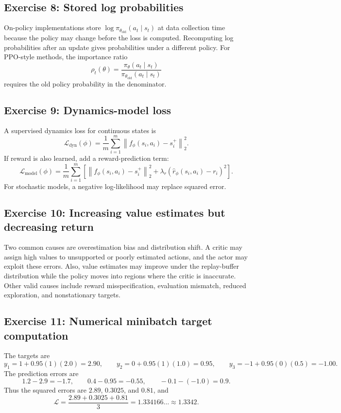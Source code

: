 \subsection*{Exercise 8: Stored log probabilities}
On-policy implementations store $\log\pi_{\theta_{\mathrm{old}}}(a_t\mid s_t)$ at data collection time because the policy may change before the loss is computed. Recomputing log probabilities after an update gives probabilities under a different policy. For PPO-style methods, the importance ratio
\[
\rho_t(\theta)=\frac{\pi_\theta(a_t\mid s_t)}{\pi_{\theta_{\mathrm{old}}}(a_t\mid s_t)}
\]
requires the old policy probability in the denominator.

\subsection*{Exercise 9: Dynamics-model loss}
A supervised dynamics loss for continuous states is
\[
\mathcal{L}_{\mathrm{dyn}}(\phi)=\frac{1}{m}\sum_{i=1}^{m}\left\|f_\phi(s_i,a_i)-s_i^+\right\|_2^2.
\]
If reward is also learned, add a reward-prediction term:
\[
\mathcal{L}_{\mathrm{model}}(\phi)=\frac{1}{m}\sum_{i=1}^{m}\left[\left\|f_\phi(s_i,a_i)-s_i^+\right\|_2^2+\lambda_r\left(\hat r_\phi(s_i,a_i)-r_i\right)^2\right].
\]
For stochastic models, a negative log-likelihood may replace squared error.

\subsection*{Exercise 10: Increasing value estimates but decreasing return}
Two common causes are overestimation bias and distribution shift. A critic may assign high values to unsupported or poorly estimated actions, and the actor may exploit these errors. Also, value estimates may improve under the replay-buffer distribution while the policy moves into regions where the critic is inaccurate. Other valid causes include reward misspecification, evaluation mismatch, reduced exploration, and nonstationary targets.

\subsection*{Exercise 11: Numerical minibatch target computation}
The targets are
\[
 y_1=1+0.95(1)(2.0)=2.90,
\qquad
 y_2=0+0.95(1)(1.0)=0.95,
\qquad
 y_3=-1+0.95(0)(0.5)=-1.00.
\]
The prediction errors are
\[
1.2-2.9=-1.7,
\qquad
0.4-0.95=-0.55,
\qquad
-0.1-(-1.0)=0.9.
\]
Thus the squared errors are $2.89$, $0.3025$, and $0.81$, and
\[
\mathcal{L}=\frac{2.89+0.3025+0.81}{3}=1.334166\ldots\approx 1.3342.
\]

